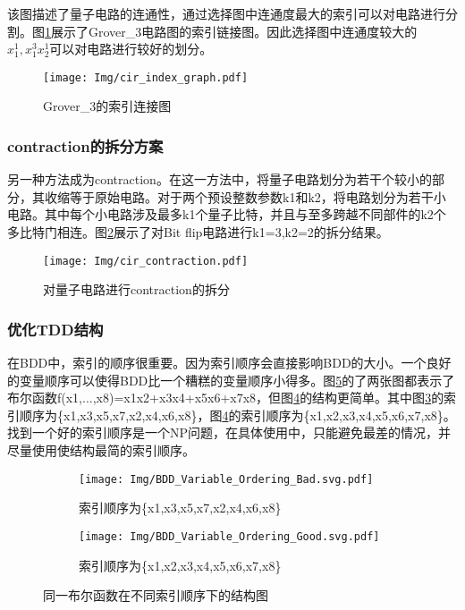 该图描述了量子电路的连通性，通过选择图中连通度最大的索引可以对电路进行分割。图\ref{fig:addition}展示了Grover\_3电路图的索引链接图。因此选择图中连通度较大的$x_1^1,x_1^3x_2^1$可以对电路进行较好的划分。
 
\begin{figure}[!htbp]
	\centering
	\texttt{[image: Img/cir\_index\_graph.pdf]}
	\caption{Grover\_3的索引连接图}
	\label{fig:addition}
\end{figure} 
\subsubsection{contraction的拆分方案}\label{contraction}
另一种方法成为contraction。在这一方法中，将量子电路划分为若干个较小的部分，其收缩等于原始电路。对于两个预设整数参数k1和k2，将电路划分为若干小电路。其中每个小电路涉及最多k1个量子比特，并且与至多跨越不同部件的k2个多比特门相连。图\ref{fig:contraction}展示了对Bit flip电路进行k1=3,k2=2的拆分结果。
\begin{figure}[!htbp]
	\centering
	\texttt{[image: Img/cir\_contraction.pdf]}
	\caption{对量子电路进行contraction的拆分}
	\label{fig:contraction}
\end{figure} 
\subsubsection{优化TDD结构}

在BDD中，索引的顺序很重要。因为索引顺序会直接影响BDD的大小。一个良好的变量顺序可以使得BDD比一个糟糕的变量顺序小得多。图\ref{fig:bdd-compare}的了两张图都表示了布尔函数ƒ(x1,...,x8)=x1x2+x3x4+x5x6+x7x8，但图\ref{fig:bdd-good}的结构更简单。其中图\ref{fig:bdd-bad}的索引顺序为\{x1,x3,x5,x7,x2,x4,x6,x8\}，图\ref{fig:bdd-good}的索引顺序为\{x1,x2,x3,x4,x5,x6,x7,x8\}。找到一个好的索引顺序是一个NP问题，在具体使用中，只能避免最差的情况，并尽量使用使结构最简的索引顺序。

\begin{figure}[!htbp]
	\centering
	\begin{subfigure}[b]{.4\textwidth}
        \centering
        \texttt{[image: Img/BDD\_Variable\_Ordering\_Bad.svg.pdf]}
		\caption{索引顺序为\{x1,x3,x5,x7,x2,x4,x6,x8\}}
		\label{fig:bdd-bad}
	\end{subfigure}
	\begin{subfigure}[b]{.4\textwidth}
        \centering
        \texttt{[image: Img/BDD\_Variable\_Ordering\_Good.svg.pdf]}
		\caption{索引顺序为\{x1,x2,x3,x4,x5,x6,x7,x8\}}
		\label{fig:bdd-good}
	\end{subfigure}
	\caption{同一布尔函数在不同索引顺序下的结构图\citep{wiki:bdd}}
	\label{fig:bdd-compare}
\end{figure}

